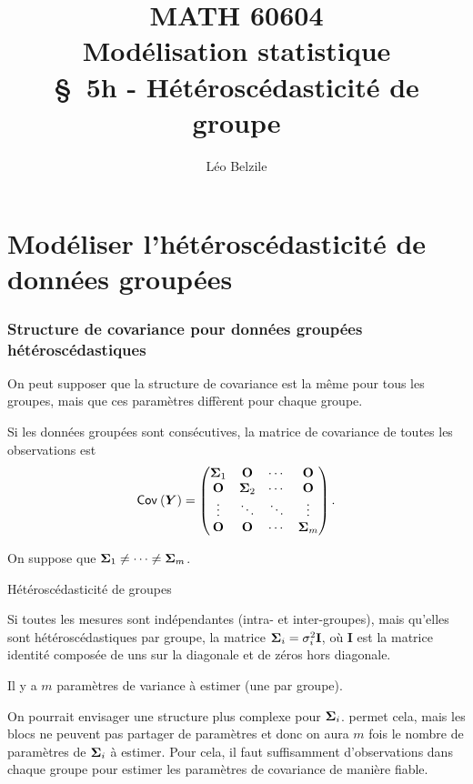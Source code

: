 \documentclass{beamer}
\title[\color{white}{MATH 60604 \S~5h - Hétéroscédasticité de groupe}]{\texorpdfstring{MATH 60604 \\Modélisation statistique \\ \S~5h - Hétéroscédasticité de groupe}{MATH 60604 \\Modélisation statistique \\ \S~5h - Hétéroscédasticité de groupe}}
\author{Léo Belzile}
\institute{HEC Montréal\\
Département de sciences de la décision}
\date{}
\begin{document}
\frame{\titlepage}


\section{Modéliser l'hétéroscédasticité de données groupées}
\begin{frame}
\frametitle{Structure de covariance pour données groupées hétéroscédastiques}
\bi 
 \item On peut supposer que la structure de covariance est la même pour tous les groupes, mais que ces paramètres diffèrent pour chaque groupe.
 \item 
Si les données groupées sont consécutives, la matrice de covariance de toutes les observations est 
 \begin{align*}
  {\mathsf{Cov}_{}}\left(\boldsymbol {Y}\right) = \begin{pmatrix}
                 \boldsymbol {\Sigma}_1 & \mathbf{O} & \cdots & \mathbf{O}\\
                  \mathbf{O} &\boldsymbol {\Sigma}_2 & \cdots & \mathbf{O} \\
                  \vdots & \ddots & \ddots & \vdots \\
                   \mathbf{O} & \mathbf{O} & \cdots & \boldsymbol {\Sigma}_m 
                \end{pmatrix}.
\end{align*}
\item On suppose que $\boldsymbol {\Sigma}_1 \neq \cdots \neq \boldsymbol {\Sigma}_m$.
\ei \end{frame}
\begin{frame}{Hétéroscédasticité de groupes}
\bi
\item Si toutes les mesures sont indépendantes (intra- et inter-groupes), mais qu'elles sont hétéroscédastiques par groupe, la matrice $\boldsymbol {\Sigma}_i = \sigma_i^2\mathbf{I}$, où $\mathbf{I}$ est la matrice identité composée de uns sur la diagonale et de zéros hors diagonale. 
\item Il y a $m$ paramètres de variance à estimer (une par groupe).
 
\item On pourrait envisager une structure plus complexe pour $\boldsymbol {\Sigma}_i$. \SASlang{} permet cela, mais les blocs ne peuvent pas partager de paramètres et donc on aura  $m$ fois le nombre de paramètres de $\boldsymbol {\Sigma}_i$ à estimer. Pour cela, il faut suffisamment d'observations dans chaque groupe pour estimer les paramètres de covariance de manière fiable.
\ei
\end{frame}
\end{document}
